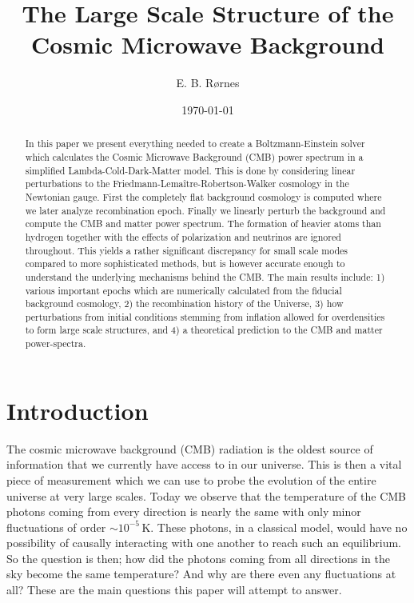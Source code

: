 \documentclass[%
reprint,
 amsmath,amssymb,
 aps,
]{revtex4-2}
\begin{document}
\title{The Large Scale Structure of the Cosmic Microwave Background}

\author{E. B. Rørnes}

\date{\today}

\begin{abstract}
In this paper we present everything needed to create a Boltzmann-Einstein solver which calculates the Cosmic Microwave Background (CMB) power spectrum in a simplified Lambda-Cold-Dark-Matter model. This is done by considering linear perturbations to the Friedmann-Lema\^itre-Robertson-Walker cosmology in the Newtonian gauge. First the completely flat background cosmology is computed where we later analyze recombination epoch. Finally we linearly perturb the background and compute the CMB and matter power spectrum. The formation of heavier atoms than hydrogen together with the effects of polarization and neutrinos are ignored throughout. This yields a rather significant discrepancy for small scale modes compared to more sophisticated methods, but is however accurate enough to understand the underlying mechanisms behind the CMB. The main results include: 1) various important epochs which are numerically calculated from the fiducial background cosmology, 2) the recombination history of the Universe, 3) how perturbations from initial conditions stemming from inflation allowed for overdensities to form large scale structures, and 4) a theoretical prediction to the CMB and matter power-spectra.
\end{abstract}

\maketitle

\tableofcontents
\newpage
\section*{Introduction}
The cosmic microwave background (CMB) radiation is the oldest source of information that we currently have access to in our universe. This is then a vital piece of measurement which we can use to probe the evolution of the entire universe at very large scales. Today we observe that the temperature of the CMB photons coming from every direction is nearly the same with only minor fluctuations of order $\sim10^{-5}\,$K. These photons, in a classical model, would have no possibility of causally interacting with one another to reach such an equilibrium. So the question is then; how did the photons coming from all directions in the sky become the same temperature? And why are there even any fluctuations at all? These are the main questions this paper will attempt to answer.
\end{document}
